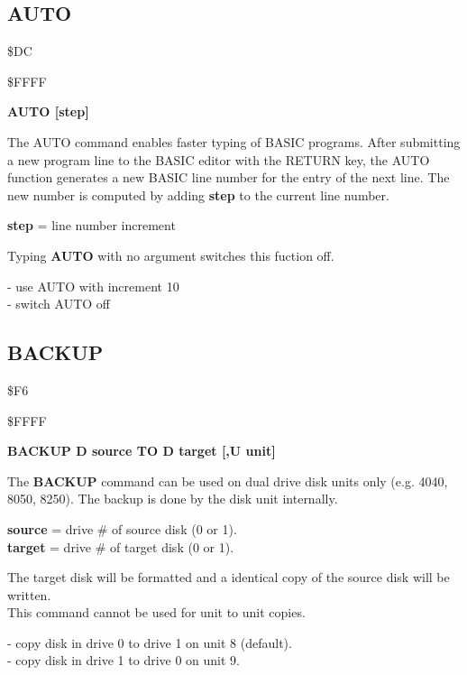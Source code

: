 \subsection{AUTO}
\begin{description}[leftmargin=3cm,style=nextline]
\item [Token:] \$DC
\item [Address:] \$FFFF
\item [Format:]
  {\bf AUTO [step]}
\item [Usage:] The AUTO command enables faster typing of BASIC programs.
  After submitting a new program line to the BASIC editor with
  the RETURN key, the AUTO function generates a new BASIC line
  number for the entry of the next line. The new number is
  computed by adding {\bf step} to the current line number.

  {\bf step} = line number increment

  Typing {\bf AUTO} with no argument switches this fuction off.

\item [Example:]  - use AUTO with increment 10 \\
                   - switch AUTO off
\end{description}


\newpage
\subsection{BACKUP}
\begin{description}[leftmargin=3cm,style=nextline]
\item [Token:] \$F6
\item [Address:] \$FFFF
\item [Format:] {\bf BACKUP D source TO D target [,U unit]}
\item [Usage:] The {\bf BACKUP} command can be used on dual drive
   disk units only (e.g. 4040, 8050, 8250).
   The backup is done by the disk unit internally.

   {\bf source} = drive \# of source disk (0 or 1). \\
   {\bf target} = drive \# of target disk (0 or 1).

\item [Remarks:]  The target disk will be formatted and
                 a identical copy of the source disk will be written. \\
                 This command cannot be used for unit to unit copies.

\item [Example:]  - copy disk in drive 0 to
                   drive 1 on unit 8 (default).\\
                  - copy disk in drive 1 to
                   drive 0 on unit 9.\\
\end{description}
\newpage

